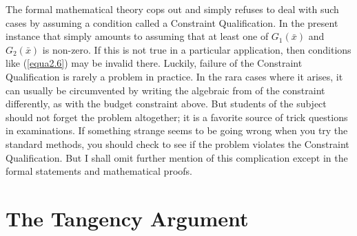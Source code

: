 The formal mathematical theory cops out and simply refuses to deal with such cases by assuming a condition called a Constraint Qualification. In the present instance that simply amounts to assuming that at least one of $G_1(\bar{x})$ and $G_2(\bar{x})$ is non-zero. If this is not true in a particular application, then conditions like (\ref{equa2.6}) may be invalid there. Luckily, failure of the Constraint Qualification is rarely a problem in practice. In the rara cases where it arises, it can usually be circumvented by writing the algebraic from of the constraint differently, as with the budget constraint above. But students of the subject should not forget the problem altogether; it is a favorite source of trick questions in examinations. If something strange seems to be going wrong when you try the standard methods, you should check to see if the problem violates the Constraint Qualification. But I shall omit further mention of this complication except in the formal statements and mathematical proofs.

\section*{The Tangency Argument}

